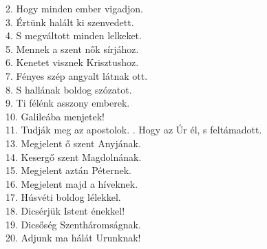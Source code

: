 \documentclass[twoside]{article}
\begin{document}


\begin{hymnstanzas}
  2. Hogy minden ember vigadjon. \\
  3. Értünk halált ki szenvedett. \\
  4. S megváltott minden lelkeket. \\
  5. Mennek a szent nők sírjához. \\
  6. Kenetet visznek Krisztushoz. \\
  7. Fényes szép angyalt látnak ott. \\
  8. S hallának boldog szózatot. \\
  9. Ti félénk asszony emberek. \\
  10. Galileába menjetek! \\
  11. Tudják meg az apostolok.
. Hogy az Úr él, s feltámadott. \\
  13. Megjelent ő szent Anyjának. \\
  14. Kesergő szent Magdolnának. \\
  15. Megjelent aztán Péternek. \\
  16. Megjelent majd a híveknek. \\
  17. Húsvéti boldog lélekkel. \\
  18. Dicsérjük Istent énekkel! \\
  19. Dicsőség Szentháromságnak. \\
  20. Adjunk ma hálát Urunknak!
\end{hymnstanzas}




\end{document}
